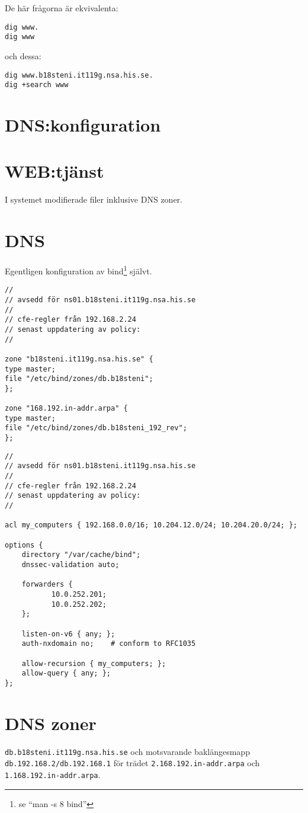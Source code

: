 \documentclass[11pt,a4paper]{article}
\begin{document}
De här frågorna är ekvivalenta:
\begin{verbatim}
dig www.
dig www
\end{verbatim}
och dessa:
\begin{verbatim}
dig www.b18steni.it119g.nsa.his.se.
dig +search www
\end{verbatim}

\section{DNS:konfiguration}\label{sec:dns_config}

\section{WEB:tjänst}\label{sec:httpd_config}

\appendix

I systemet modifierade filer inklusive DNS zoner.

\section{DNS}\label{sec:appendix_bind_config}

Egentligen konfiguration av bind\footnote{se ``man -s 8 bind''} självt.

\begin{lstlisting}[caption={/etc/bind/named.conf.local}]
//
// avsedd för ns01.b18steni.it119g.nsa.his.se
//
// cfe-regler från 192.168.2.24
// senast uppdatering av policy:
//

zone "b18steni.it119g.nsa.his.se" {
type master;
file "/etc/bind/zones/db.b18steni";
};

zone "168.192.in-addr.arpa" {
type master;
file "/etc/bind/zones/db.b18steni_192_rev";
};
\end{lstlisting}

\begin{lstlisting}[caption={/etc/bind/named.conf.options}]
//
// avsedd för ns01.b18steni.it119g.nsa.his.se
//
// cfe-regler från 192.168.2.24
// senast uppdatering av policy:
//

acl my_computers { 192.168.0.0/16; 10.204.12.0/24; 10.204.20.0/24; };

options {
    directory "/var/cache/bind";
    dnssec-validation auto;

    forwarders {
           10.0.252.201;
           10.0.252.202;
    };

    listen-on-v6 { any; };
    auth-nxdomain no;    # conform to RFC1035

    allow-recursion { my_computers; };
    allow-query { any; };
};
\end{lstlisting}

\section{DNS zoner}\label{sec:appendix_dns_zones}

\texttt{db.b18steni.it119g.nsa.his.se} och motsvarande baklängesmapp\@
\texttt{ db.192.168.2/db.192.168.1} för trädet \texttt{2.168.192.in-addr.arpa}
och \texttt{1.168.192.in-addr.arpa}.
\printbibliography{}
\end{document}
